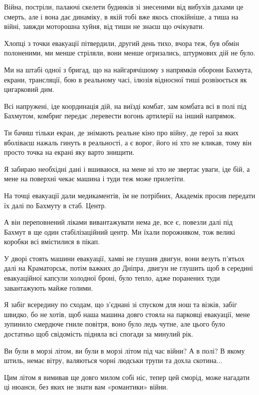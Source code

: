 Війна, постріли, палаючі скелети будинків зі знесеними від вибухів дахами це
смерть, але і вона дає динаміку, в якій тобі вже якось спокійніше, а тиша на
війні, завжди моторошна хуйня, від тиши не знаєш що очікувати. 

Хлопці з точки евакуації пітвердили, другий день тихо, вчора теж, був обмін
полоненими, ми менше стріляли, вони менше огризались, штурмових дій не було. 

Ми на штабі одної з бригад, що на найгарячішому з напрямків оборони Бахмута,
екрани, трансляції, бою в реальному часі, ілюзія відносної тиші розвіюється як
цигарковий дим. 

Всі напружені, іде координація дій, на виїзді комбат, зам комбата всі в полі
під Бахмутом, комбриг передає ,перевести вогонь артилерії на інший напрямок. 

Ти бачиш тільки екран, де знімають реальне кіно про війну, де герої за яких
вболіваєш  нажаль гинуть в реальності, а є ворог, його ні хто не кликав, тому
він просто точка на екрані яку варто знищити. 

Я забираю необхідні дані і вшиваюся, на мене ні хто не звертає уваги, іде бій,
а мене на поверхні чекає машина і туди теж може прилетіти. 

На точці евакуації дали медикаментів, їм не потрібних, Академік просив передати
їх далі по Бахмуту в стаб. Центр.

А він переповнений ліками вивантажувати нема де, все є, повезли далі під
Бахмут в ще один стабілізаційний центр. Ми їхали порожняком, тож великі
коробки всі вмістилися в пікап. 

У дворі стоять машини евакуації, хамві не глушив двигун, вони везуть п'ятьох
далі на Краматорськ, потім важких до Дніпра, двигун не глушить щоб в
середині евакуаційної капсули холодної броні, було тепло, адже поранених
туди завантажують майже голими.  

Я забіг всередину по сходам, що з'єднані зі спуском для нош та візків, забіг
швидко, бо не хотів, щоб наша машина довго стояла на парковці евакуації, мене
зупинило смердюче гниле повітря, воно було ледь чутне, але цього було
достатньо щоб свідомість підняла всі спогади за минулий рік.

Ви були в морзі літом, ви були в морзі літом під час війни? А в полі? В якому
штиль, немає вітру, валяються чорні людськи трупи та дохла скотина... 

Цим літом я вимивав ще довго милом собі ніс, тепер цей сморід, може нагадати ці
нюанси, без яких не знати вам «романтики» війни. 

